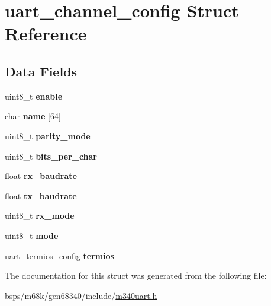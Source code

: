 \hypertarget{structuart__channel__config}{}\section{uart\+\_\+channel\+\_\+config Struct Reference}
\label{structuart__channel__config}
\subsection*{Data Fields}
\begin{DoxyCompactItemize}
\item 
\mbox{\label{structuart__channel__config_a0a19070f215c9909d8df0be24f6b3c31}} 
uint8\+\_\+t {\bfseries enable}
\item 
\mbox{\label{structuart__channel__config_ad58a2afd098b58bce253d344adf04850}} 
char {\bfseries name} \mbox{[}64\mbox{]}
\item 
\mbox{\label{structuart__channel__config_affda641d6544420e4c4a754bd240491d}} 
uint8\+\_\+t {\bfseries parity\+\_\+mode}
\item 
\mbox{\label{structuart__channel__config_abe29b1003712261e9a90060ae4af7be2}} 
uint8\+\_\+t {\bfseries bits\+\_\+per\+\_\+char}
\item 
\mbox{\label{structuart__channel__config_a20657362b61dd4357e78d4f22c548695}} 
float {\bfseries rx\+\_\+baudrate}
\item 
\mbox{\label{structuart__channel__config_a2b7e203954b7a2f9cef311868d25a4b7}} 
float {\bfseries tx\+\_\+baudrate}
\item 
\mbox{\label{structuart__channel__config_a42271c6bc4fc5c24ac38a96e5475e506}} 
uint8\+\_\+t {\bfseries rx\+\_\+mode}
\item 
\mbox{\label{structuart__channel__config_a426ea082ddb59482a87fc38cb508652c}} 
uint8\+\_\+t {\bfseries mode}
\item 
\mbox{\label{structuart__channel__config_a9ac615c810c3b7fc99a24f78618f4b2e}} 
\mbox{\hyperlink{structuart__termios__config}{uart\+\_\+termios\+\_\+config}} {\bfseries termios}
\end{DoxyCompactItemize}


The documentation for this struct was generated from the following file\+:\begin{DoxyCompactItemize}
\item 
bsps/m68k/gen68340/include/\mbox{\hyperlink{m340uart_8h}{m340uart.\+h}}\end{DoxyCompactItemize}
